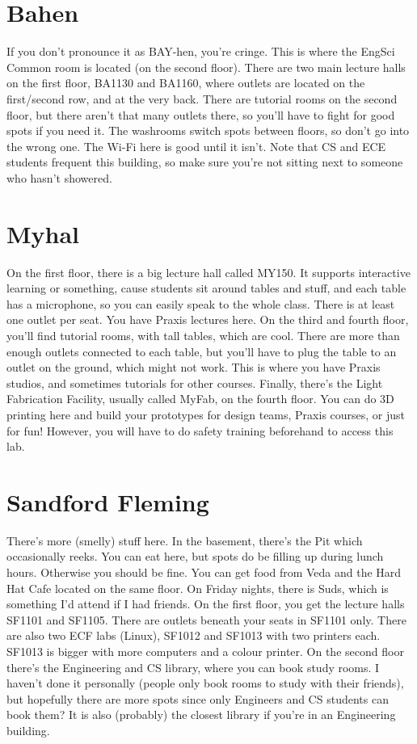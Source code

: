\section{Bahen}

If you don't pronounce it as BAY-hen, you're cringe. This is where the EngSci Common room is located (on the second floor). There are two main lecture halls on the first floor, BA1130 and BA1160, where outlets are located on the first/second row, and at the very back. There are tutorial rooms on the second floor, but there aren't that many outlets there, so you'll have to fight for good spots if you need it. The washrooms switch spots between floors, so don't go into the wrong one. The Wi-Fi here is good until it isn't. Note that CS and ECE students frequent this building, so make sure you're not sitting next to someone who hasn't showered.

\section{Myhal}

On the first floor, there is a big lecture hall called MY150. It supports interactive learning or something, cause students sit around tables and stuff, and each table has a microphone, so you can easily speak to the whole class. There is at least one outlet per seat. You have Praxis lectures here. On the third and fourth floor, you'll find tutorial rooms, with tall tables, which are cool. There are more than enough outlets connected to each table, but you'll have to plug the table to an outlet on the ground, which might not work. This is where you have Praxis studios, and sometimes tutorials for other courses. Finally, there's the Light Fabrication Facility, usually called MyFab, on the fourth floor. You can do 3D printing here and build your prototypes for design teams, Praxis courses, or just for fun! However, you will have to do safety training beforehand to access this lab.

\section{Sandford Fleming}

There's more (smelly) stuff here. In the basement, there's the Pit which occasionally reeks. You can eat here, but spots do be filling up during lunch hours. Otherwise you should be fine. You can get food from Veda and the Hard Hat Cafe located on the same floor. On Friday nights, there is Suds, which is something I'd attend if I had friends. On the first floor, you get the lecture halls SF1101 and SF1105. There are outlets beneath your seats in SF1101 only. There are also two ECF labs (Linux), SF1012 and SF1013 with two printers each. SF1013 is bigger with more computers and a colour printer. On the second floor there's the Engineering and CS library, where you can book study rooms. I haven't done it personally (people only book rooms to study with their friends), but hopefully there are more spots since only Engineers and CS students can book them? It is also (probably) the closest library if you're in an Engineering building.


